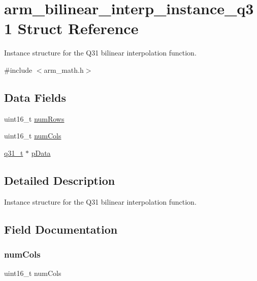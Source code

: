 \hypertarget{structarm__bilinear__interp__instance__q31}{}\section{arm\+\_\+bilinear\+\_\+interp\+\_\+instance\+\_\+q31 Struct Reference}
\label{structarm__bilinear__interp__instance__q31}


Instance structure for the Q31 bilinear interpolation function.  




{\ttfamily \#include $<$arm\+\_\+math.\+h$>$}

\subsection*{Data Fields}
\begin{DoxyCompactItemize}
\item 
uint16\+\_\+t \mbox{\hyperlink{structarm__bilinear__interp__instance__q31_a1bcf80ccdc2acc29198f1592ae300390}{num\+Rows}}
\item 
uint16\+\_\+t \mbox{\hyperlink{structarm__bilinear__interp__instance__q31_a4bb5ec0d13eb4c9cf887aa8366a44117}{num\+Cols}}
\item 
\mbox{\hyperlink{arm__math_8h_adc89a3547f5324b7b3b95adec3806bc0}{q31\+\_\+t}} $\ast$ \mbox{\hyperlink{structarm__bilinear__interp__instance__q31_ad296f76577326ff280726323536eed6d}{p\+Data}}
\end{DoxyCompactItemize}


\subsection{Detailed Description}
Instance structure for the Q31 bilinear interpolation function. 

\subsection{Field Documentation}
\mbox{\label{structarm__bilinear__interp__instance__q31_a4bb5ec0d13eb4c9cf887aa8366a44117}} 
\subsubsection{\texorpdfstring{numCols}{numCols}}
{\footnotesize\ttfamily uint16\+\_\+t num\+Cols}


